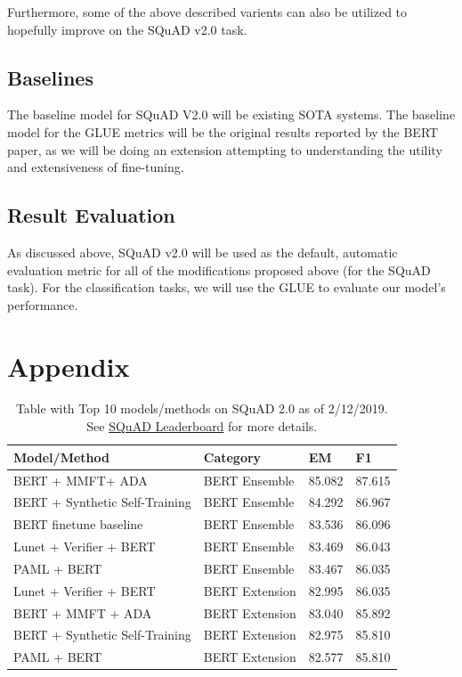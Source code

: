 \documentclass{article}
\begin{document}
Furthermore, some of the above described varients can also be utilized to hopefully improve on the SQuAD v2.0 task. 

\subsection{Baselines}
The baseline model for SQuAD V2.0 will be existing SOTA systems. The baseline model for the GLUE metrics will be the original results reported by the BERT \cite{BERT} paper, as we will be doing an extension attempting to understanding the utility and extensiveness of fine-tuning.

\subsection{Result Evaluation}
As discussed above, SQuAD v2.0 will be used as the default, automatic evaluation metric for all of the modifications proposed above (for the SQuAD task). For the classification tasks, we will use the GLUE to evaluate our model's performance. 

\section{Appendix}

\begin{table}[!ht]
\centering
\begin{tabular}{l|l|l|l}
Model/Method                   & Category       & EM     & F1     \\ \hline
BERT + MMFT+ ADA               & BERT Ensemble  & 85.082 & 87.615 \\
BERT + Synthetic Self-Training & BERT Ensemble  & 84.292 & 86.967 \\
BERT finetune baseline         & BERT Ensemble  & 83.536 & 86.096 \\
Lunet + Verifier + BERT        & BERT Ensemble  & 83.469 & 86.043 \\
PAML + BERT                    & BERT Ensemble  & 83.467 & 86.035 \\
Lunet + Verifier + BERT        & BERT Extension & 82.995 & 86.035 \\
BERT + MMFT + ADA              & BERT Extension & 83.040 & 85.892 \\
BERT + Synthetic Self-Training & BERT Extension & 82.975 & 85.810 \\
PAML + BERT                    & BERT Extension & 82.577 & 85.810
\end{tabular}
\caption{Table with Top 10 models/methods on SQuAD 2.0 as of 2/12/2019. See \href{https://rajpurkar.github.io/SQuAD-explorer/}{SQuAD Leaderboard} for more details.}
\label{table:top_10_squad}
\end{table}
\end{document}
